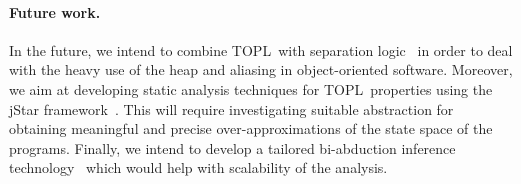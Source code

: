 \documentclass{llncs} %
\newcommand{\TPL}{TOPL}
\newcommand{\noterg}[2]{\textcolor{gray}{[\textcolor{red}{#1}: #2]}}
\newcommand{\dd}[1]{\noterg{dd}{#1}}
\newcommand{\dinocomment}[1]{\dd{#1}}
\begin{document}
\paragraph{Future work.}
In the future, we intend to combine \TPL \ with  separation logic~\cite{reynolds2002} in order to deal with the heavy use of the heap and aliasing in object-oriented software. Moreover, we aim at developing static analysis techniques for \TPL \ properties using the jStar framework~\cite{DBLP:conf/oopsla/DistefanoP08}.
This will require investigating suitable abstraction for obtaining meaningful and precise over-approximations of the state space of the programs.
Finally, we intend to develop a tailored bi-abduction inference technology~\cite{dblp:conf/popl/CalcagnoDOY09} which would help with scalability of the analysis.
\end{document}
